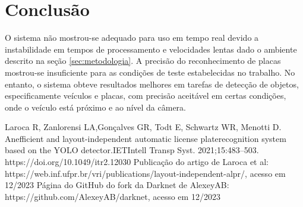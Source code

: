 \documentclass[conference]{IEEEtran}
\begin{document}
\section{Conclusão}
\label{sec:conclusao}
O sistema não mostrou-se adequado para uso em tempo real devido a instabilidade em tempos de processamento e velocidades lentas dado o ambiente descrito na seção \ref{sec:metodologia}.
A precisão do reconhecimento de placas mostrou-se insuficiente para as condições de teste estabelecidas no trabalho. No entanto, o sistema obteve resultados melhores em tarefas de detecção de objetos, especificamente veículos e placas, com precisão aceitável em certas condições, onde o veículo está próximo e ao nível da câmera.

\begin{thebibliography}{00}
 Laroca R, Zanlorensi LA,Gonçalves GR, Todt E, Schwartz WR, Menotti D. Anefficient and layout-independent automatic license platerecognition system based on the YOLO detector.IETIntell Transp Syst. 2021;15:483–503. https://doi.org/10.1049/itr2.12030
 Publicação do artigo de Laroca et al: https://web.inf.ufpr.br/vri/publications/layout-independent-alpr/, acesso em 12/2023
 Página do GitHub do fork da Darknet de AlexeyAB: https://github.com/AlexeyAB/darknet, acesso em 12/2023
\end{thebibliography}
\end{document}
